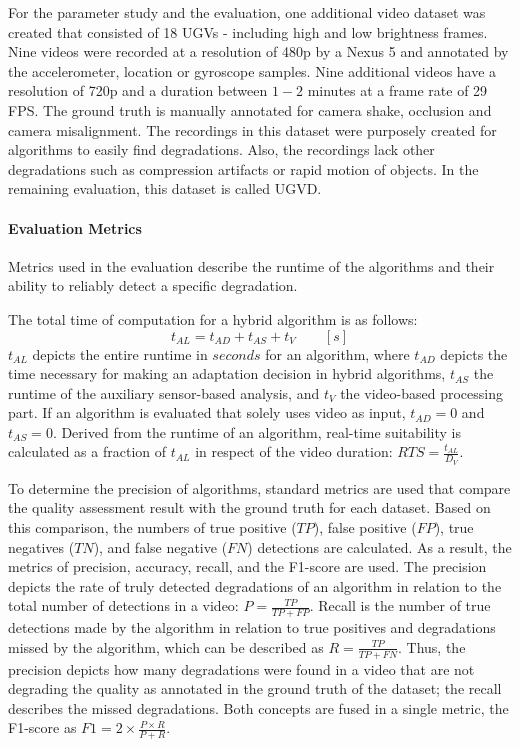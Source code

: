 For the parameter study and the evaluation, one additional video dataset was created that consisted of 18 \ac{UGV}s - including high and low brightness frames. 
Nine videos were recorded at a resolution of \ac{480p} by a Nexus 5 and annotated by the accelerometer, location or gyroscope samples.
Nine additional videos have a resolution of \ac{720p} and a duration between $1-2$ minutes at a frame rate of 29 \ac{FPS}. 
The ground truth is manually annotated for camera shake, occlusion and camera misalignment.
The recordings in this dataset were purposely created for algorithms to easily find degradations. 
Also, the recordings lack other degradations such as compression artifacts or rapid motion of objects. 
In the remaining evaluation, this dataset is called UGVD.
\paragraph{Evaluation Metrics}
\label{sec:556_eva_metrics} 
Metrics used in the evaluation describe the runtime of the algorithms and their ability to reliably detect a specific degradation.

The total time of computation for a hybrid algorithm is as follows:
\begin{equation}\label{eq:556_run-time} 
  t_{AL}{= } t_{AD} + t_{AS} + t_{V} \qquad [\unit{s}]
\end{equation}
$t_{AL}$ depicts the entire runtime in $\unit{seconds}$ for an algorithm, where $t_{AD}$ depicts the time necessary for making an adaptation decision in hybrid algorithms, $t_{AS}$ the runtime of the auxiliary sensor-based analysis, and $t_{V}$ the video-based processing part.
If an algorithm is evaluated that solely uses video as input, $t_{AD} = 0$ and $t_{AS} = 0$.
Derived from the runtime of an algorithm, real-time suitability is calculated as a fraction of $t_{AL}$ in respect of the video duration: $RTS=\frac{t_{AL}}{D_{V}}$.

To determine the precision of algorithms, standard metrics are used that compare the quality assessment result with the ground truth for each dataset.
Based on this comparison, the numbers of true positive ($TP$), false positive ($FP$), true negatives ($TN$), and false negative ($FN$) detections are calculated.
As a result, the metrics of precision, accuracy, recall, and the F1-score are used.	
The precision depicts the rate of truly detected degradations of an algorithm in relation to the total number of detections in a video: $P= \frac{TP}{TP + FP}$.
Recall is the number of true detections made by the algorithm in relation to true positives and degradations missed by the algorithm, which can be described as
$R = \frac{TP}{TP + FN}$.
Thus, the precision depicts how many degradations were found in a video that are not degrading the quality as annotated in the ground truth of the dataset; the recall describes the missed degradations.
Both concepts are fused in a single metric, the F1-score as $F1= 2 \times \frac{P \times R}{P + R}$.
